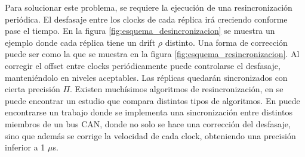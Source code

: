 
Para solucionar este problema, se requiere la ejecución de una resincronización periódica. El desfasaje entre los clocks de cada réplica irá creciendo conforme pase el tiempo. En la figura \ref{fig:esquema_desincronizacion} se muestra un ejemplo donde cada réplica tiene un drift $\rho$ distinto. Una forma de corrección puede ser como la que se muestra en la figura \ref{fig:esquema_resincronizacion}. Al corregir el offset entre clocks periódicamente puede controlarse el desfasaje, manteniéndolo en niveles aceptables. Las réplicas quedarán sincronizados con cierta precisión $\Pi$. Existen muchísimos algoritmos de resincronización, en \cite{anceaume1998performance} se puede encontrar un estudio que compara distintos tipos de algoritmos. En \cite{9501400} puede encontrarse un trabajo donde se implementa una sincronización entre distintos miembros de un bus CAN, donde no solo se hace una corrección del desfasaje, sino que además se corrige la velocidad de cada clock, obteniendo una precisión inferior a 1 $\mu$s.


